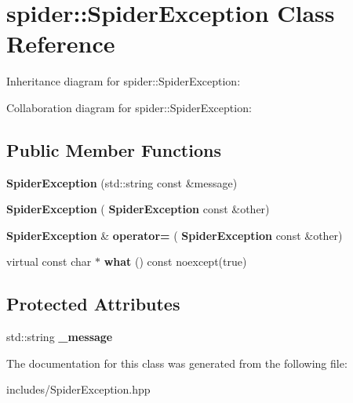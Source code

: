 \section{spider\+:\+:Spider\+Exception Class Reference}
\label{classspider_1_1_spider_exception}


Inheritance diagram for spider\+:\+:Spider\+Exception\+:


Collaboration diagram for spider\+:\+:Spider\+Exception\+:
\subsection*{Public Member Functions}
\begin{DoxyCompactItemize}
\item 
\mbox{\label{classspider_1_1_spider_exception_ac1d9b09c46f784c65af0ccfa5a121836}} 
{\bfseries Spider\+Exception} (std\+::string const \&message)
\item 
\mbox{\label{classspider_1_1_spider_exception_a1c0be87484f4e6cf69be2c14c35435d2}} 
{\bfseries Spider\+Exception} (\textbf{ Spider\+Exception} const \&other)
\item 
\mbox{\label{classspider_1_1_spider_exception_ad4449683f11bf69300aefd3b0348bc0c}} 
\textbf{ Spider\+Exception} \& {\bfseries operator=} (\textbf{ Spider\+Exception} const \&other)
\item 
\mbox{\label{classspider_1_1_spider_exception_a83966aeb6494231a91bca0b6fa2863e9}} 
virtual const char $\ast$ {\bfseries what} () const noexcept(true)
\end{DoxyCompactItemize}
\subsection*{Protected Attributes}
\begin{DoxyCompactItemize}
\item 
\mbox{\label{classspider_1_1_spider_exception_aa0f728154d091f67989b3ac84651c158}} 
std\+::string {\bfseries \+\_\+message}
\end{DoxyCompactItemize}


The documentation for this class was generated from the following file\+:\begin{DoxyCompactItemize}
\item 
includes/Spider\+Exception.\+hpp\end{DoxyCompactItemize}
